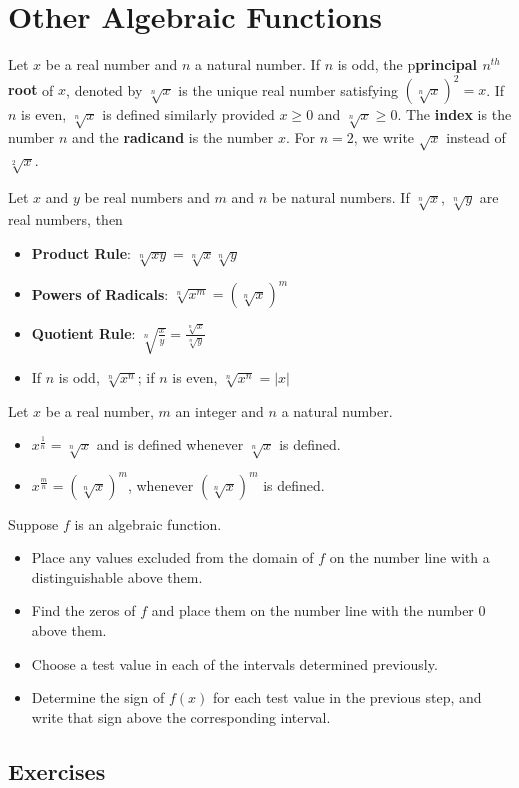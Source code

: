 \section{Other Algebraic Functions}

\begin{definition}[Radicals]
    Let $x$ be a real number and $n$ a natural number. If $n$ is odd, the p\textbf{principal $n^{th}$ root} of $x$, denoted by $\sqrt[n]{x}$ is the unique real number satisfying $(\sqrt[n]{x})^2 = x$. If $n$ is even, $\sqrt[n]{x}$ is defined similarly provided $x \geq 0$ and $\sqrt[n]{x} \geq 0$. The \textbf{index} is the number $n$ and the \textbf{radicand} is the number $x$. For $n=2$, we write $\sqrt{x}$ instead of $\sqrt[2]{x}$.
\end{definition}

\begin{theorem}
    Let $x$ and $y$ be real numbers and $m$ and $n$ be natural numbers. If $\sqrt[n]{x}$, $\sqrt[n]{y}$ are real numbers, then
    \begin{itemize}
        \item \textbf{Product Rule}: $\sqrt[n]{xy}=\sqrt[n]{x}\sqrt[n]{y}$
        \item \textbf{Powers of Radicals}: $\sqrt[n]{x^m} = (\sqrt[n]{x})^m$
        \item \textbf{Quotient Rule}: $\sqrt[n]{\frac{x}{y}} = \frac{\sqrt[n]{x}}{\sqrt[n]{y}}$
        \item If $n$ is odd, $\sqrt[n]{x^n}$; if $n$ is even, $\sqrt[n]{x^n} = |x|$
    \end{itemize}
\end{theorem}

\begin{definition}
    Let $x$ be a real number, $m$ an integer and $n$ a natural number.
    \begin{itemize}
        \item $x^{\frac{1}{n}} = \sqrt[n]{x}$ and is defined whenever $\sqrt[n]{x}$ is defined.
        \item $x^{\frac{m}{n}} = (\sqrt[n]{x})^m$, whenever $(\sqrt[n]{x})^m$ is defined.
    \end{itemize}
\end{definition}

\begin{procedure}
    Suppose $f$ is an algebraic function.
    \begin{itemize}
        \item Place any values excluded from the domain of $f$ on the number line with a distinguishable above them.
        \item Find the zeros of $f$ and place them on the number line with the number 0 above them.
        \item Choose a test value in each of the intervals determined previously.
        \item Determine the sign of $f(x)$ for each test value in the previous step, and write that sign above the corresponding interval.
    \end{itemize}
\end{procedure}


\subsection{Exercises}

